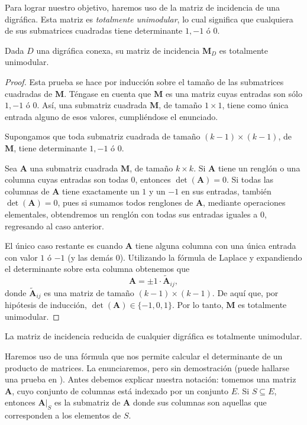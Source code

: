 Para lograr nuestro objetivo, haremos uso de la matriz de incidencia de una digráfica. Esta matriz es \textit{totalmente unimodular}, lo cual significa que cualquiera de sus submatrices cuadradas tiene determinante $1, -1$ ó $0$.

\begin{teo} \label{teo:totalmenteunimodular}
Dada $D$ una digráfica conexa, su matriz de incidencia $\mathbf{M}_{D}$ es totalmente unimodular.
\end{teo}

\begin{proof} Esta prueba se hace por inducción sobre el tamaño de las submatrices cuadradas de $\mathbf{M}$. Téngase en cuenta que $\mathbf{M}$ es una matriz cuyas entradas son sólo $1, -1$ ó $0$. Así, una submatriz cuadrada $\mathbf{M}$, de tamaño $1 \times 1$, tiene como única entrada alguno de esos valores, cumpliéndose el enunciado.

Supongamos que toda submatriz cuadrada de tamaño $(k-1) \times (k-1)$, de $\mathbf{M}$, tiene determinante $1, -1$ ó $0$. 

Sea $\textbf{A}$ una submatriz cuadrada $\mathbf{M}$, de tamaño $k \times k$. Si $\textbf{A}$ tiene un renglón o una columna cuyas entradas son todas $0$, entonces $\det(\textbf{A}) = 0$. Si todas las columnas de $\textbf{A}$ tiene exactamente un $1$ y un $-1$ en sus entradas, también $\det(\textbf{A}) = 0$, pues si sumamos todos renglones de $\textbf{A}$, mediante operaciones elementales, obtendremos un renglón con todas sus entradas iguales a $0$, regresando al caso anterior.

El único caso restante es cuando $\textbf{A}$ tiene alguna columna con una única entrada con valor $1$ ó $-1$ (y las demás $0$). Utilizando la fórmula de Laplace y expandiendo el determinante sobre esta columna obtenemos que $$\textbf{A} = \pm 1 \cdot\widetilde{\textbf{A}}_{ij},$$ donde $\widetilde{\textbf{A}}_{ij}$ es una matriz de tamaño $(k-1) \times (k-1)$. De aquí que, por hipótesis de inducción, $\det(\textbf{A}) \in \{-1, 0,1\}$. Por lo tanto, $\mathbf{M}$ es totalmente unimodular.

\end{proof}

\begin{cor}
La matriz de incidencia reducida de cualquier digráfica es totalmente unimodular.
\end{cor}

Haremos uso de una fórmula que nos permite calcular el determinante de un producto de matrices. La enunciaremos, pero sin demostración (puede hallarse una prueba en \cite{Deo}). Antes debemos explicar nuestra notación: tomemos una matriz $\textbf{A}$, cuyo conjunto de columnas está indexado por un conjunto $E$. Si $S\subseteq E$, entonces $\textbf{A}|_{S}$ es la submatriz de $\textbf{A}$ donde sus columnas son aquellas que corresponden a los elementos de $S$.

